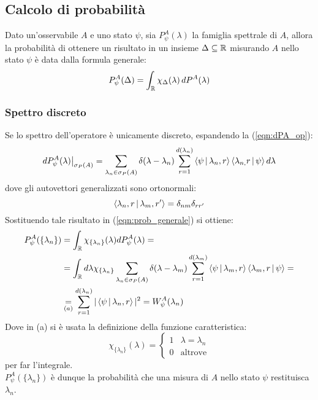 \documentclass[../../FisicaTeorica.tex]{subfiles}
\begin{document}
\subsection{Calcolo di probabilità}
Dato un'osservabile $A$ e uno stato $\psi$, sia $P^A_\psi(\lambda)$ la famiglia spettrale di $A$, allora la probabilità di ottenere un risultato in un insieme $\Delta\subseteq \mathbb{R}$ misurando $A$ nello stato $\psi$ è data dalla formula generale:
\begin{equation}
P^A_\psi(\Delta) = \int_{\mathbb{R}} \chi_\Delta(\lambda)\,dP^A(\lambda)
\label{eqn:prob_generale}
\end{equation}
\subsubsection{Spettro discreto}
Se lo spettro dell'operatore è unicamente discreto, espandendo la (\ref{eqn:dPA_op}):
\[
dP^A_\psi(\lambda)\big|_{\sigma_P(A)}=\sum_{\lambda_n\in\sigma_P(A)}\delta(\lambda-\lambda_n)\sum_{r=1}^{d(\lambda_n)}\Braket{\psi|\lambda_{n},r}\Braket{\lambda_{n,}r|\psi}d\lambda
\]
dove gli autovettori generalizzati sono ortonormali:
\[
\Braket{\lambda_{n},r|\lambda_{m},r'}=\delta_{nm}\delta_{rr'}
\]
Sostituendo tale risultato in (\ref{eqn:prob_generale}) si ottiene:
\begin{align}
P_\psi^A(\{\lambda_n\})&=\int_{\mathbb{R}} \chi_{\{\lambda_n\}}(\lambda)dP_\psi^A(\lambda)=\nonumber \\
&=
\int_{\mathbb{R}} d\lambda \chi_{\{\lambda_n\}}\sum_{\lambda_n\in\sigma_P(A)}\delta(\lambda-\lambda_m)\sum_{r=1}^{d(\lambda_m)}\Braket{\psi|\lambda_{m},r}\Braket{\lambda_{m},r|\psi} =\nonumber \\
&\underset{(a)}{=} \sum_{r=1}^{d(\lambda_n)}|\Braket{\psi|\lambda_{n},r}|^2 = W^A_\psi(\lambda_n)
\label{eqn:probability_discreta}
\end{align}
Dove in (a) si è usata la definizione della funzione caratteristica:
\[
\chi_{\{\lambda_n\}}(\lambda)=
\begin{cases}
1 & \lambda=\lambda_n\\
0 & \text{altrove}
\end{cases}
\]
per far  l'integrale.\\
$P_\psi^A(\{\lambda_n\})$ è dunque la probabilità che una misura di $A$ nello stato $\psi$ restituisca $\lambda_n$.\\
\end{document}
